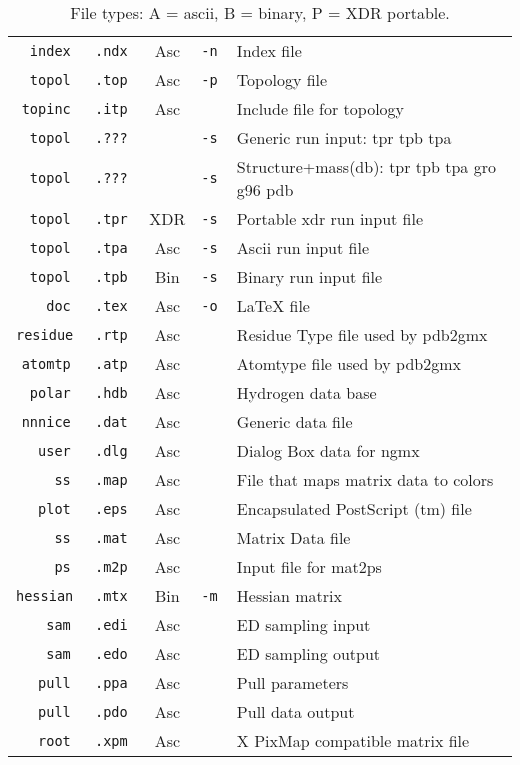 \begin{table}[p]
\begin{tabularx}{\linewidth}{rlccX}
\tt    index & \tt .ndx & Asc & \tt -n & Index file \\
\tt    topol & \tt .top & Asc & \tt -p & Topology file \\
\tt   topinc & \tt .itp & Asc & \tt    & Include file for topology \\
\tt    topol & \tt .??? &     & \tt -s & Generic run input: tpr tpb tpa \\
\tt    topol & \tt .??? &     & \tt -s & Structure+mass(db): tpr tpb tpa gro g96 pdb \\
\tt    topol & \tt .tpr & XDR & \tt -s & Portable xdr run input file \\
\tt    topol & \tt .tpa & Asc & \tt -s & Ascii run input file \\
\tt    topol & \tt .tpb & Bin & \tt -s & Binary run input file \\
\tt      doc & \tt .tex & Asc & \tt -o & LaTeX file \\
\tt  residue & \tt .rtp & Asc & \tt    & Residue Type file used by pdb2gmx \\
\tt   atomtp & \tt .atp & Asc & \tt    & Atomtype file used by pdb2gmx \\
\tt    polar & \tt .hdb & Asc & \tt    & Hydrogen data base \\
\tt   nnnice & \tt .dat & Asc & \tt    & Generic data file \\
\tt     user & \tt .dlg & Asc & \tt    & Dialog Box data for ngmx \\
\tt       ss & \tt .map & Asc & \tt    & File that maps matrix data to colors \\
\tt     plot & \tt .eps & Asc & \tt    & Encapsulated PostScript (tm) file \\
\tt       ss & \tt .mat & Asc & \tt    & Matrix Data file \\
\tt       ps & \tt .m2p & Asc & \tt    & Input file for mat2ps \\
\tt  hessian & \tt .mtx & Bin & \tt -m & Hessian matrix \\
\tt      sam & \tt .edi & Asc & \tt    & ED sampling input \\
\tt      sam & \tt .edo & Asc & \tt    & ED sampling output \\
\tt     pull & \tt .ppa & Asc & \tt    & Pull parameters \\
\tt     pull & \tt .pdo & Asc & \tt    & Pull data output \\
\tt     root & \tt .xpm & Asc & \tt    & X PixMap compatible matrix file \\
\hline
\end{tabularx}
\caption{File types: A = ascii, B = binary, P = XDR portable.}
\label{Tab:form}
\end{table}
